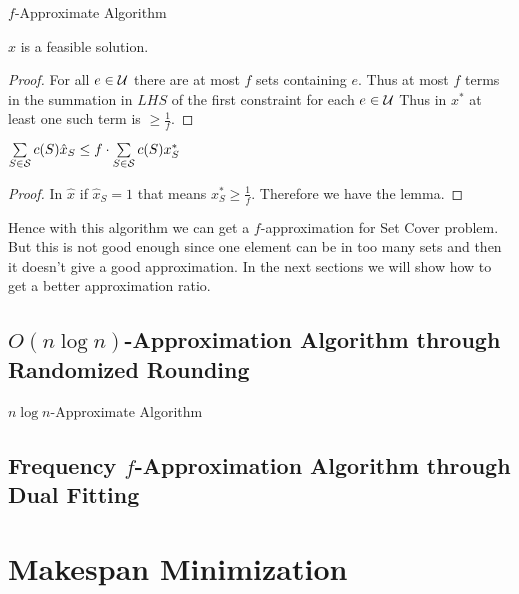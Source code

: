 \begin{algorithm}\DontPrintSemicolon
    \caption{$f$-Approximate Algorithm}
\end{algorithm}
\begin{lemma}{}{}
    $\hat{x}$ is a feasible solution.
\end{lemma}
\begin{proof}
    For all $e\in \mathcal{U}$ there are at most $f$ sets containing $e$. Thus at most $f$ terms in the summation in $LHS$ of the first constraint for each $e\in \mathcal{U}$ Thus in $x^*$ at least one such term is $\geq \frac1f$.
\end{proof}
\begin{lemma}{}{}
    $\sum\limits_{S\in \mathcal{S}}c(S)\hat{x}_S\leq f\cdot \sum\limits_{S\in\mathcal{S}}c(S)x^*_S$
\end{lemma}
\begin{proof}
    In $\hat{x}$ if $\hat{x}_S=1$ that means $x^*_S\geq \frac1f$. Therefore we have the lemma.
\end{proof}

Hence with this algorithm we can get a $f$-approximation for Set Cover problem. But this is not good enough since one element can be in too many sets and then it doesn't give a good approximation. In the next sections we will show how to get a better approximation ratio.

\subsection{\texorpdfstring{$O(n\log n)$}{O(nlogn)}-Approximation Algorithm through Randomized Rounding}

\begin{algorithm}\DontPrintSemicolon
    \caption{$n\log n$-Approximate Algorithm}
\end{algorithm}

\subsection{Frequency \texorpdfstring{$f$}{f}-Approximation Algorithm through Dual Fitting}
\section{Makespan Minimization}